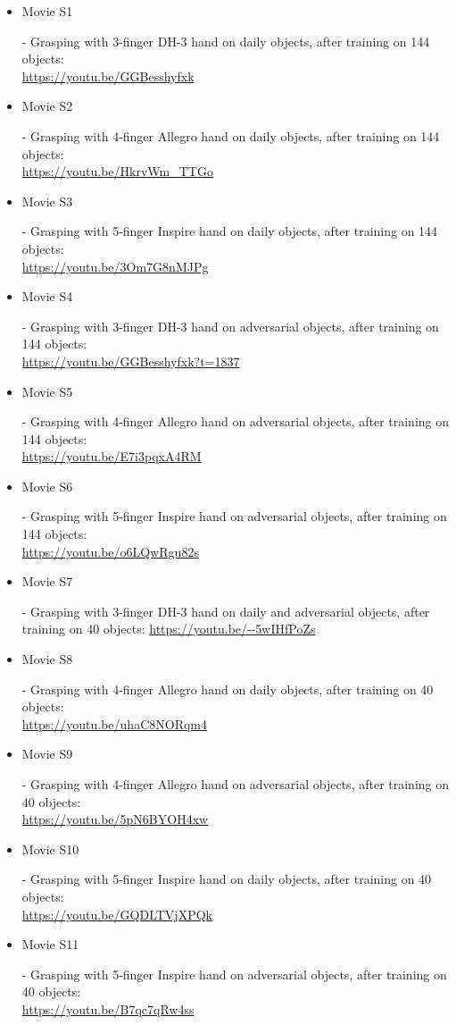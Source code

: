 \begin{itemize}
    \item \hypertarget{movie_s1}{Movie S1} - Grasping with 3-finger DH-3 hand on daily objects, after training on 144 objects: \\\url{https://youtu.be/GGBesshyfxk}
    \item \hypertarget{movie_s2}{Movie S2} - Grasping with 4-finger Allegro hand on daily objects, after training on 144 objects: \\\url{https://youtu.be/HkrvWm_TTGo}
    \item \hypertarget{movie_s2}{Movie S3} - Grasping with 5-finger Inspire hand on daily objects, after training on 144 objects: \\\url{https://youtu.be/3Om7G8nMJPg}
    \item \hypertarget{movie_s4}{Movie S4} - Grasping with 3-finger DH-3 hand on adversarial objects, after training on 144 objects: \\\url{https://youtu.be/GGBesshyfxk?t=1837}
    \item \hypertarget{movie_s5}{Movie S5} - Grasping with 4-finger Allegro hand on adversarial objects, after training on 144 objects: \\\url{https://youtu.be/E7i3pqxA4RM}
    \item \hypertarget{movie_s6}{Movie S6} - Grasping with 5-finger Inspire hand on adversarial objects, after training on 144 objects: \\\url{https://youtu.be/o6LQwRgu82s}
    \item \hypertarget{movie_s7}{Movie S7} - Grasping with 3-finger DH-3 hand on daily and adversarial objects, after training on 40 objects:  \url{https://youtu.be/--5wIHfPoZs}
    \item \hypertarget{movie_s8}{Movie S8} - Grasping with 4-finger Allegro hand on daily objects, after training on 40 objects: \\\url{https://youtu.be/uhaC8NORqm4}
    \item \hypertarget{movie_s9}{Movie S9} - Grasping with 4-finger Allegro hand on adversarial objects, after training on 40 objects: \\\url{https://youtu.be/5pN6BYOH4xw}
    \item \hypertarget{movie_s10}{Movie S10} - Grasping with 5-finger Inspire hand on daily objects, after training on 40 objects: \\\url{https://youtu.be/GQDLTVjXPQk} 
    \item \hypertarget{movie_s11}{Movie S11} - Grasping with 5-finger Inspire hand on adversarial objects, after training on 40 objects: \\\url{https://youtu.be/B7qc7qRw4ss} 
\end{itemize}

